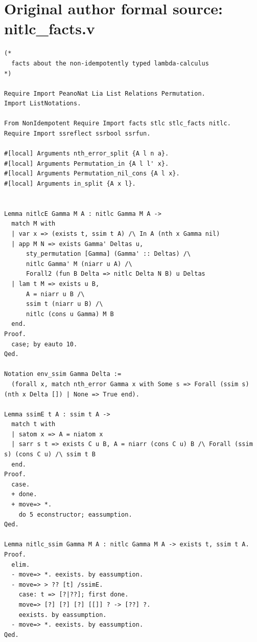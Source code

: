 \documentclass[10pt,a4paper]{article}
\begin{document}
\section*{Original author formal source: nitlc\_facts.v}
\begin{lstlisting}[style=authorcoq]
(*
  facts about the non-idempotently typed lambda-calculus
*)

Require Import PeanoNat Lia List Relations Permutation.
Import ListNotations.

From NonIdempotent Require Import facts stlc stlc_facts nitlc.
Require Import ssreflect ssrbool ssrfun.

#[local] Arguments nth_error_split {A l n a}.
#[local] Arguments Permutation_in {A l l' x}.
#[local] Arguments Permutation_nil_cons {A l x}.
#[local] Arguments in_split {A x l}.


Lemma nitlcE Gamma M A : nitlc Gamma M A ->
  match M with
  | var x => (exists t, ssim t A) /\ In A (nth x Gamma nil)
  | app M N => exists Gamma' Deltas u,
      sty_permutation [Gamma] (Gamma' :: Deltas) /\
      nitlc Gamma' M (niarr u A) /\
      Forall2 (fun B Delta => nitlc Delta N B) u Deltas
  | lam t M => exists u B,
      A = niarr u B /\
      ssim t (niarr u B) /\
      nitlc (cons u Gamma) M B
  end.
Proof.
  case; by eauto 10.
Qed.

Notation env_ssim Gamma Delta :=
  (forall x, match nth_error Gamma x with Some s => Forall (ssim s) (nth x Delta []) | None => True end).

Lemma ssimE t A : ssim t A ->
  match t with
  | satom x => A = niatom x
  | sarr s t => exists C u B, A = niarr (cons C u) B /\ Forall (ssim s) (cons C u) /\ ssim t B
  end.
Proof.
  case.
  + done.
  + move=> *.
    do 5 econstructor; eassumption.
Qed.

Lemma nitlc_ssim Gamma M A : nitlc Gamma M A -> exists t, ssim t A.
Proof.
  elim.
  - move=> *. eexists. by eassumption.
  - move=> > ?? [t] /ssimE.
    case: t => [?|??]; first done.
    move=> [?] [?] [?] [[]] ? -> [??] ?.
    eexists. by eassumption.
  - move=> *. eexists. by eassumption.
Qed.


\end{lstlisting}
\end{document}
